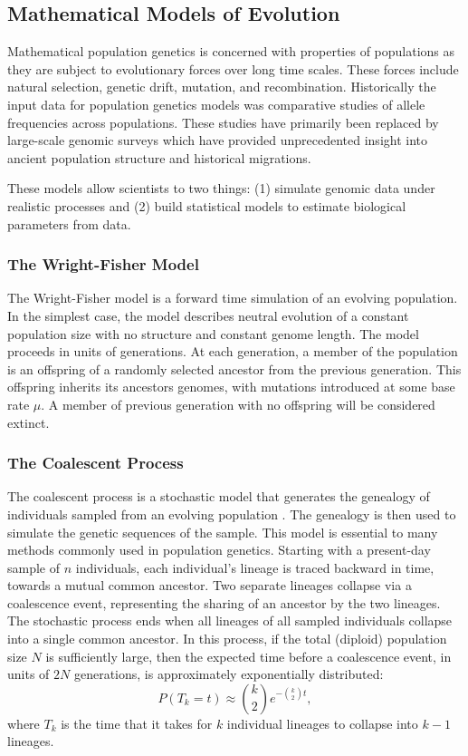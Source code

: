\subsection{Mathematical Models of Evolution}
\label{bg:bio:models}

Mathematical population genetics is concerned with properties of populations as they are subject to evolutionary forces over long time scales.
These forces include natural selection, genetic drift, mutation, and recombination.
Historically the input data for population genetics models was comparative studies of allele frequencies across populations.
These studies have primarily been replaced by large-scale genomic surveys which have provided unprecedented insight into ancient population structure and historical migrations.

These models allow scientists to two things: (1) simulate genomic data under realistic processes and (2) build statistical models to estimate biological parameters from data.

\subsubsection{The Wright-Fisher Model}
\label{bg:bio:models:wrightfisher}

The Wright-Fisher model is a forward time simulation of an evolving population.
In the simplest case, the model describes neutral evolution of a constant population size with no structure and constant genome length.
The model proceeds in units of generations.
At each generation, a member of the population is an offspring of a randomly selected ancestor from the previous generation.
This offspring inherits its ancestors genomes, with mutations introduced at some base rate $\mu$.
A member of previous generation with no offspring will be considered extinct.

\subsubsection{The Coalescent Process}
\label{bg:bio:models:coalescent}

The coalescent process is a stochastic model that generates the genealogy of individuals sampled from an evolving population \cite{Wakeley:2009}.
The genealogy is then used to simulate the genetic sequences of the sample.
This model is essential to many methods commonly used in population genetics.
Starting with a present-day sample of $n$ individuals, each individual's lineage is traced backward in time, towards a mutual common ancestor.
Two separate lineages collapse via a coalescence event, representing the sharing of an ancestor by the two lineages.
The stochastic process ends when all lineages of all sampled individuals collapse into a single common ancestor.
In this process, if the total (diploid) population size $N$ is sufficiently large, then the expected time before a coalescence event, in units of $2N$ generations, is approximately exponentially distributed:
\begin{equation}
P(T_{k}=t) \approx \binom{k}{2} e^{-\binom{k}{2} t},
\end{equation}
where $T_k$ is the time that it takes for $k$ individual lineages to collapse into $k-1$ lineages.

